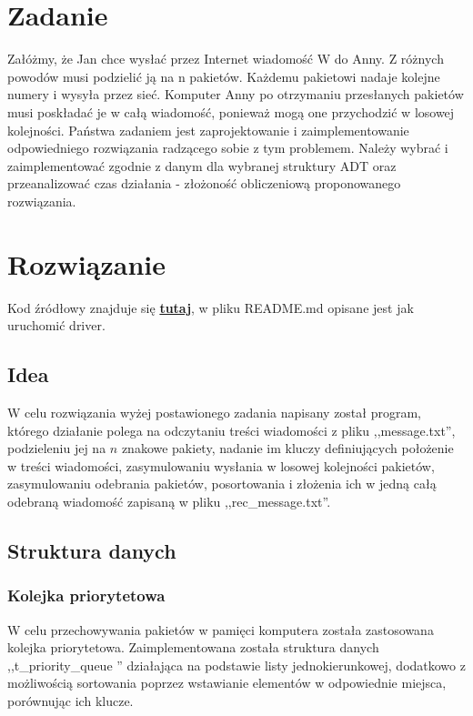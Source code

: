 \documentclass[12pt]{article}
\begin{document}
    


\section{Zadanie}\label{ch:1}


Załóżmy, że Jan chce wysłać przez Internet wiadomość W do Anny. Z różnych powodów musi podzielić
ją na n pakietów. Każdemu pakietowi nadaje kolejne numery i wysyła przez sieć. Komputer Anny po otrzymaniu
przesłanych pakietów musi poskładać je w całą wiadomość, ponieważ mogą one przychodzić w losowej
kolejności. Państwa zadaniem jest zaprojektowanie i zaimplementowanie odpowiedniego rozwiązania radzącego
sobie z tym problemem. Należy wybrać i zaimplementować zgodnie z danym dla wybranej struktury
ADT oraz przeanalizować czas działania - złożoność obliczeniową proponowanego rozwiązania.

\section{Rozwiązanie}\label{ch:2}

Kod źródłowy znajduje się  \href{https://github.com/PartyKusZ/PAMSI}{\textbf{tutaj}}, w pliku README.md opisane jest jak uruchomić driver.

\subsection{Idea}

W celu rozwiązania wyżej postawionego zadania napisany został program, którego działanie polega na odczytaniu treści wiadomości z pliku ,,message.txt'',
podzieleniu jej na $n$ znakowe pakiety, nadanie im kluczy definiujących położenie w treści wiadomości, zasymulowaniu wysłania w losowej kolejności pakietów, zasymulowaniu 
odebrania pakietów, posortowania i złożenia ich w jedną całą odebraną wiadomość zapisaną w pliku ,,rec\_message.txt''.

\subsection{Struktura danych}

\subsubsection{Kolejka priorytetowa}

W celu przechowywania pakietów w pamięci komputera została zastosowana kolejka priorytetowa. Zaimplementowana została struktura danych ,,t\_priority\_queue '' działająca na podstawie listy jednokierunkowej, dodatkowo z możliwością sortowania 
poprzez wstawianie elementów w odpowiednie miejsca, porównując ich klucze.
\end{document}
